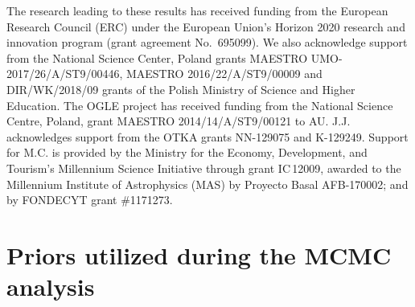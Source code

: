 \documentclass[twocolumn,times]{aastex63}
\begin{document}
\acknowledgments
The research leading to these results has received funding from the European Research Council (ERC) under the European Union's Horizon 2020
research and innovation program (grant agreement No.~695099). We also acknowledge support from the National Science Center, Poland grants
MAESTRO UMO-2017/26/A/ST9/00446, MAESTRO 2016/22/A/ST9/00009 and DIR/WK/2018/09 grants of the Polish Ministry of Science and Higher Education.
The OGLE project has received funding from the National Science Centre, Poland, grant MAESTRO 2014/14/A/ST9/00121 to AU.
J.J. acknowledges support from the OTKA grants NN-129075 and K-129249.
Support for M.C. is provided by the Ministry for the Economy, Development, and Tourism's Millennium Science Initiative through grant
IC\,12009, awarded to the Millennium Institute of Astrophysics (MAS) by Proyecto Basal AFB-170002; and by FONDECYT grant \#1171273.



\vspace{5mm}






\appendix

\restartappendixnumbering

\section{Priors utilized during the MCMC analysis} \label{app:priors}
\end{document}
